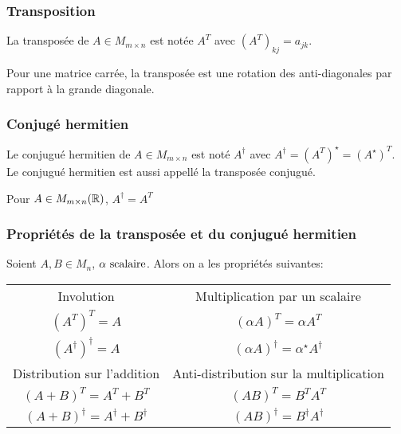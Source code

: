 \endgroup

\subsubsection{Transposition}
\begin{definition}
    La transposée de $A \in M_{m \times n}$ est notée $A^T$ avec $\left(A^T\right)_{kj} = a_{jk}$.
    \begin{remark}
        Pour une matrice carrée, la transposée est une rotation des anti-diagonales par rapport à la grande diagonale.
    \end{remark}
\end{definition}

\subsubsection{Conjugé hermitien}
\begin{definition}
    Le conjugué hermitien de $A \in M_{m \times n}$ est noté $A^\dagger$ avec $A^\dagger = \left(A^T\right)^\star = \left(A^\star\right)^T$.
    Le conjugué hermitien est aussi appellé la transposée conjugué.
\end{definition}
\begin{remark}
    Pour $A \in M_{m \times n}(\mathbb{R})$, $A^\dagger = A^T$
\end{remark}

\subsubsection{Propriétés de la transposée et du conjugué hermitien}
Soient $A, B \in M_n$, $\alpha \text{ scalaire}$. Alors on a les propriétés suivantes:

\begingroup
\renewcommand{\arraystretch}{1.5}

\begin{center}
    \begin{tabular}{c @{\hskip 1in} c}
        Involution                                             & Multiplication par un scalaire                             \\
        $ \left( A^T \right)^T = A$                            & $\left( \alpha A \right)^T = \alpha A^T$                   \\
        $\left( A^\dagger \right)^\dagger = A $                & $\left( \alpha A \right)^\dagger = \alpha^\star A^\dagger$ \\[0.5em]
        Distribution sur l'addition                            & Anti-distribution sur la multiplication                    \\
        $\left( A + B \right)^T = A^T + B^T$                   & $\left( AB \right)^T = B^TA^T$                             \\
        $\left( A + B \right)^\dagger = A^\dagger + B^\dagger$ & $\left( AB \right)^\dagger = B^\dagger A^\dagger$
    \end{tabular}
\end{center}
\endgroup

